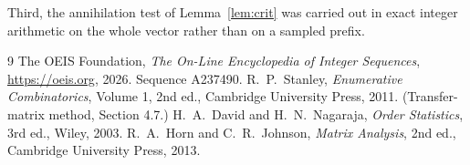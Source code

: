 \documentclass[11pt,a4paper]{article}
\theoremstyle{plain}
\theoremstyle{definition}
\begin{document}
Third, the annihilation test of Lemma~\ref{lem:crit} was carried out in exact integer
arithmetic on the whole vector rather than on a sampled prefix.

\begin{thebibliography}{9}
 The OEIS Foundation, \emph{The On-Line Encyclopedia of Integer
Sequences}, \url{https://oeis.org}, 2026. Sequence A237490.
 R.~P.~Stanley, \emph{Enumerative Combinatorics}, Volume 1, 2nd ed.,
Cambridge University Press, 2011. (Transfer-matrix method, Section 4.7.)
 H.~A.~David and H.~N.~Nagaraja, \emph{Order Statistics}, 3rd ed., Wiley,
2003.
 R.~A.~Horn and C.~R.~Johnson, \emph{Matrix Analysis}, 2nd ed., Cambridge
University Press, 2013.
\end{thebibliography}
\end{document}
